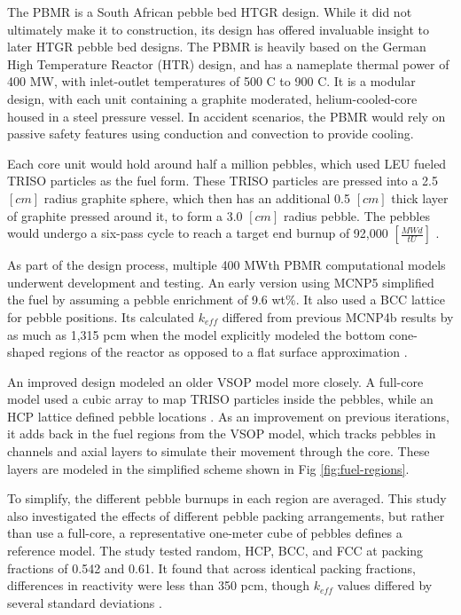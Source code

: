 The PBMR is a South African pebble bed HTGR design.  While it did not ultimately make it to construction, its design has offered invaluable insight to later HTGR pebble bed designs.  The PBMR is heavily based on the German High Temperature Reactor (HTR) design, and has a nameplate thermal power of 400 MW, with inlet-outlet temperatures of 500 \textdegree C to 900 \textdegree C.  It is a modular design, with each unit containing a graphite moderated, helium-cooled-core housed in a steel pressure vessel.  In accident scenarios, the PBMR would rely on passive safety features using conduction and convection to provide cooling.

Each core unit would hold around half a million pebbles, which used LEU fueled TRISO particles as the fuel form.  These TRISO particles are pressed into a 2.5 $\left[cm\right]$ radius graphite sphere, which then has an additional 0.5 $\left[cm\right]$ thick layer of graphite pressed around it, to form a 3.0 $\left[cm\right]$ radius pebble.  The pebbles would undergo a six-pass cycle to reach a target end burnup of 92,000 $\left[\frac{MWd}{tU}\right]$ \cite{venter_pbmr_2005}.

As part of the design process, multiple 400 MWth PBMR computational models underwent development and testing.  An early version using MCNP5 simplified the fuel by assuming a pebble enrichment of 9.6 wt\%.  It also used a BCC lattice for pebble positions.  Its calculated $k_{eff}$ differed from previous MCNP4b results by as much as 1,315 pcm when the model explicitly modeled the bottom cone-shaped regions of the reactor as opposed to a flat surface approximation \cite{kim_monte_nodate}.

An improved design modeled an older VSOP model more closely.  A full-core model used a cubic array to map TRISO particles inside the pebbles, while an HCP lattice defined pebble locations \cite{albornoz_mcnp_nodate}.  As an improvement on previous iterations, it adds back in the fuel regions from the VSOP model, which tracks pebbles in channels and axial layers to simulate their movement through the core.  These layers are modeled in the simplified scheme shown in Fig \ref{fig:fuel-regions}.



To simplify, the different pebble burnups in each region are averaged.  This study also investigated the effects of different pebble packing arrangements, but rather than use a full-core, a representative one-meter cube of pebbles defines a reference model.  The study tested random, HCP, BCC, and FCC at packing fractions of 0.542 and 0.61.  It found that across identical packing fractions, differences in reactivity were less than 350 pcm, though $k_{eff}$ values differed by several standard deviations \cite{albornoz_mcnp_nodate}.

